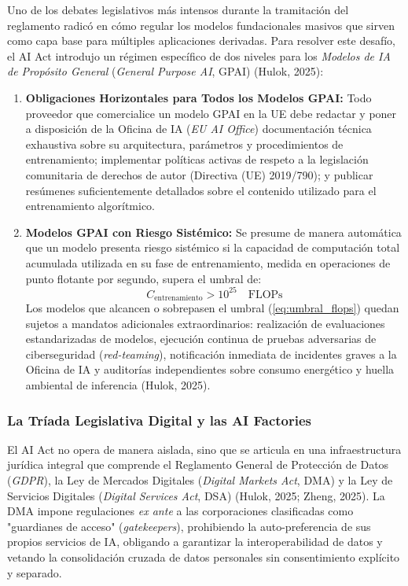 Uno de los debates legislativos más intensos durante la tramitación del reglamento radicó en cómo regular los modelos fundacionales masivos que sirven como capa base para múltiples aplicaciones derivadas. Para resolver este desafío, el AI Act introdujo un régimen específico de dos niveles para los \textit{Modelos de IA de Propósito General} (\textit{General Purpose AI}, GPAI) (Hulok, 2025):
\begin{enumerate}[label=\arabic*., leftmargin=2em]
    \item \textbf{Obligaciones Horizontales para Todos los Modelos GPAI:} Todo proveedor que comercialice un modelo GPAI en la UE debe redactar y poner a disposición de la Oficina de IA (\textit{EU AI Office}) documentación técnica exhaustiva sobre su arquitectura, parámetros y procedimientos de entrenamiento; implementar políticas activas de respeto a la legislación comunitaria de derechos de autor (Directiva (UE) 2019/790); y publicar resúmenes suficientemente detallados sobre el contenido utilizado para el entrenamiento algorítmico.
    \item \textbf{Modelos GPAI con Riesgo Sistémico:} Se presume de manera automática que un modelo presenta riesgo sistémico si la capacidad de computación total acumulada utilizada en su fase de entrenamiento, medida en operaciones de punto flotante por segundo, supera el umbral de:
    \begin{equation}
        C_{\text{entrenamiento}} > 10^{25} \quad \text{FLOPs}
        \label{eq:umbral_flops}
    \end{equation}
    Los modelos que alcancen o sobrepasen el umbral (\ref{eq:umbral_flops}) quedan sujetos a mandatos adicionales extraordinarios: realización de evaluaciones estandarizadas de modelos, ejecución continua de pruebas adversarias de ciberseguridad (\textit{red-teaming}), notificación inmediata de incidentes graves a la Oficina de IA y auditorías independientes sobre consumo energético y huella ambiental de inferencia (Hulok, 2025).
\end{enumerate}

\subsubsection{La Tríada Legislativa Digital y las AI Factories}

El AI Act no opera de manera aislada, sino que se articula en una infraestructura jurídica integral que comprende el Reglamento General de Protección de Datos (\textit{GDPR}), la Ley de Mercados Digitales (\textit{Digital Markets Act}, DMA) y la Ley de Servicios Digitales (\textit{Digital Services Act}, DSA) (Hulok, 2025; Zheng, 2025). La DMA impone regulaciones \textit{ex ante} a las corporaciones clasificadas como "guardianes de acceso" (\textit{gatekeepers}), prohibiendo la auto-preferencia de sus propios servicios de IA, obligando a garantizar la interoperabilidad de datos y vetando la consolidación cruzada de datos personales sin consentimiento explícito y separado.

